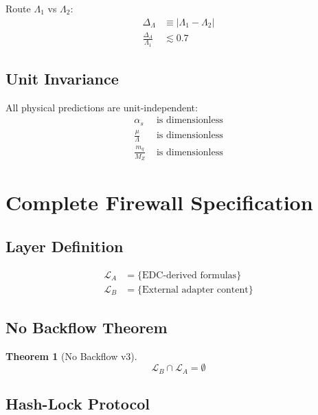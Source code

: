 \documentclass[11pt,a4paper]{article}
\theoremstyle{definition}
\newtheorem{theorem}{Theorem}[section]
\begin{document}
Route $\Lambda_1$ vs $\Lambda_2$:
\begin{align}
\label{eq:inv-6}
\Delta_{\Lambda} &\equiv |\Lambda_1 - \Lambda_2| \\
\label{eq:inv-7}
\frac{\Delta_{\Lambda}}{\Lambda_1} &\lesssim 0.7
\end{align}

\subsection{Unit Invariance}
\label{subsec:inv-unit}

All physical predictions are unit-independent:
\begin{align}
\label{eq:inv-8}
\alpha_s &\text{ is dimensionless} \\
\label{eq:inv-9}
\frac{\mu}{\Lambda} &\text{ is dimensionless} \\
\label{eq:inv-10}
\frac{m_q}{M_Z} &\text{ is dimensionless}
\end{align}

\section{Complete Firewall Specification}
\label{app:firewall-spec}

\subsection{Layer Definition}
\label{subsec:fw-layer-def}

\begin{align}
\label{eq:fw-1}
\mathcal{L}_A &= \{\text{EDC-derived formulas}\} \\
\label{eq:fw-2}
\mathcal{L}_B &= \{\text{External adapter content}\}
\end{align}

\subsection{No Backflow Theorem}
\label{subsec:fw-no-backflow}

\begin{theorem}[No Backflow v3]
\label{thm:fw-no-backflow}
\begin{equation}
\label{eq:fw-3}
\mathcal{L}_B \cap \mathcal{L}_A = \emptyset
\end{equation}
\end{theorem}

\subsection{Hash-Lock Protocol}
\label{subsec:fw-hash}
\end{document}
